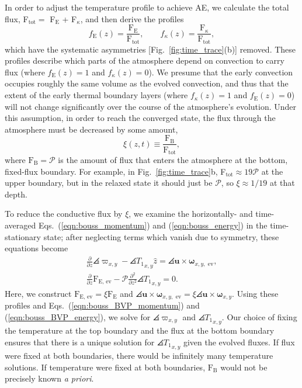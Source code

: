In order to adjust the temperature profile to achieve AE, we calculate the total flux, F$_{\text{tot}} =$ F$_{\text{E}}$ + F$_{\kappa}$, and then derive the profiles
\begin{equation}
f_{\text{E}}(z) = \frac{\text{F}_{\text{E}}}{\text{F}_{\text{tot}}},\qquad
f_{\kappa}(z) = \frac{\text{F}_{\kappa}}{\text{F}_{\text{tot}}},
\label{eqn:bvp_ratios}
\end{equation}
which have the systematic asymmetries [Fig.~\ref{fig:time_trace}(b)] removed. 
These profiles describe which parts of the atmosphere depend on convection to carry flux (where $f_{\text{E}}(z) = 1$ and $f_{\kappa}(z) = 0$).
We presume that the early convection occupies roughly the same volume as the evolved convection, and thus that the extent of the early thermal boundary layers (where $f_{\kappa}(z) = 1$ and $f_{\text{E}}(z) = 0$) will not change significantly over the course of the atmosphere's evolution.
Under this assumption, in order to reach the converged state, the flux through the atmosphere must be decreased by some amount, 
\begin{equation}
\xi(z,t) \equiv \frac{\text{F}_{\text{B}}}{\text{F}_{\text{tot}}},
\label{eqn:xi}
\end{equation}
where $\text{F}_{\text{B}} = \mathcal{P}$ is the amount of flux that enters the atmosphere at the bottom, fixed-flux boundary.
For example, in Fig.~\ref{fig:time_trace}b, F$_{\text{tot}} \approx 19\mathcal{P}$ at the upper boundary, but in the relaxed state it should just be $\mathcal{P}$, so $\xi \approx 1/19$ at that depth.

To reduce the conductive flux by $\xi$, we examine the horizontally- and time-averaged Eqs.~(\ref{eqn:bouss_momentum}) and (\ref{eqn:bouss_energy}) in the time-stationary state; after neglecting terms which vanish due to symmetry, these equations become
\vspace{-0.2cm}
\begin{gather}
\frac{\partial}{\partial z}\angles{\varpi}_{x,y} - \angles{T_1}_{x,y}\hat{z} = \angles{\bm{u}\times\bm{\omega}}_{x,y, \text{ ev}},
	\label{eqn:bouss_BVP_momentum}
\\
\frac{\partial}{\partial z}\text{F}_{\text{E, ev}} - \mathcal{P}\frac{\partial^2}{\partial z^2} \angles{T_1}_{x,y} = 0.
	\label{eqn:bouss_BVP_energy}
\end{gather}
Here, we construct  $\text{F}_{\text{E, ev}} = \xi \text{F}_{\text{E}}$ and $\angles{\bm{u}\times\bm{\omega}}_{x, y,\text{ ev}} = \xi\angles{\bm{u}\times\bm{\omega}}_{x, y}$.
Using these profiles and Eqs.~(\ref{eqn:bouss_BVP_momentum}) and (\ref{eqn:bouss_BVP_energy}), we solve for $\angles{\varpi}_{x,y}$ and $\angles{T_1}_{x,y}$.
Our choice of fixing the temperature at the top boundary and the flux at the bottom boundary ensures that there is a unique solution for $\angles{T_1}_{x,y}$ given the evolved fluxes. 
If flux were fixed at both boundaries, there would be infinitely many temperature solutions. 
If temperature were fixed at both boundaries, $\text{F}_{\text{B}}$ would not be precisely known \emph{a priori}.

